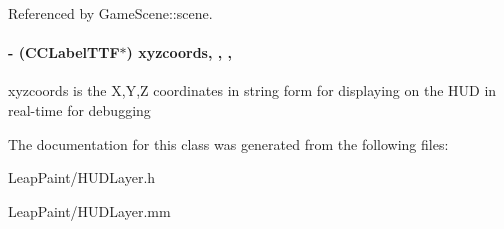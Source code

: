 Referenced by Game\-Scene\-::scene.

\hypertarget{interface_h_u_d_layer_ae0974aa467c08003e700e3d538f282c0}{
\paragraph[{xyzcoords}]{\setlength{\rightskip}{0pt plus 5cm}-\/ (C\-C\-Label\-T\-T\-F$\ast$) xyzcoords\hspace{0.3cm}{\ttfamily [read]}, {\ttfamily [write]}, {\ttfamily [nonatomic]}, {\ttfamily [strong]}}}\label{d3/d8a/interface_h_u_d_layer_ae0974aa467c08003e700e3d538f282c0}
xyzcoords is the X,Y,Z coordinates in string form for displaying on the H\-U\-D in real-\/time for debugging 

The documentation for this class was generated from the following files\-:\begin{DoxyCompactItemize}
\item 
Leap\-Paint/H\-U\-D\-Layer.\-h\item 
Leap\-Paint/H\-U\-D\-Layer.\-mm\end{DoxyCompactItemize}
